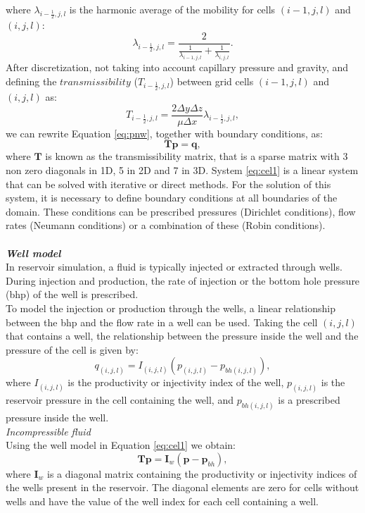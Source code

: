 \documentclass[12pt]{article}
\begin{document}
where $\lambda _{i-\frac{1}{2},j,l}$ is the harmonic average of the mobility for cells 
$(i-1,j,l)$ and $(i,j,l)$:
\begin{equation}\label{eq:ha}
 \lambda _{i-\frac{1}{2},j,l}=\frac{2}{\frac{1}{ \lambda _{i-1,j,l}}+\frac{1}{ \lambda _{i,j,l}}}.
\end{equation}
After discretization, not taking into account capillary pressure and gravity, and defining the $transmissibility$ ($T_{i-\frac{1}{2},j,l}$) between grid cells $(i-1,j,l)$ and $(i,j,l)$ as:
\begin{equation}\label{eq:htrans}
 T_{i-\frac{1}{2},j,l}=\frac{2\Delta y \Delta z}{\mu\Delta x}
 \lambda_{i-\frac{1}{2},j,l},
\end{equation}  
we can rewrite Equation \eqref{eq:pnw}, together with boundary conditions, as:
 \begin{equation}\label{eq:cel1}
\mathbf{T}\mathbf{p} = \mathbf{q},
\end{equation}
where $\mathbf{T}$ is known as the transmissibility matrix, that is a sparse matrix with 3 non zero diagonals in 1D, 5 in 2D and 7 in 3D. 
System \eqref{eq:cel1} is a linear system that can be solved with iterative or direct methods. For the solution of this system, it is necessary to define boundary conditions at all boundaries of the domain. These conditions can be prescribed pressures 
(Dirichlet conditions), flow rates (Neumann conditions) or a combination of these (Robin conditions).  \\\\
\emph{\textbf{Well model}}\\
In reservoir simulation, a fluid is typically injected or extracted through wells. During injection and production, the rate of injection or the bottom hole pressure (bhp) of the well is prescribed.\\
To model the injection or production through the wells, a linear relationship between the bhp and the flow rate in a well can be used. Taking the cell $(i,j,l)$ that contains a well, the relationship between the pressure inside the well and the pressure of the cell is given by:
\begin{equation}\label{eq:wellm}
{q}_{(i,j,l)}={I}_{(i,j,l)}({p}_{(i,j,l)}-{p}_{bh(i,j,l)}),
\end{equation}
where ${I}_{(i,j,l)}$ is the productivity or injectivity index of the well, ${p}_{(i,j,l)}$ is the reservoir pressure in the cell 
containing the well, 
and ${p}_{bh(i,j,l)}$ is a prescribed pressure inside the well. \\
\emph{Incompressible fluid}\\
Using the well model in Equation \eqref{eq:cel1} we obtain:
 \begin{equation}\label{eq:celw1}
\mathbf{T}\mathbf{p} = \mathbf{I}_w(\mathbf{p}-\mathbf{p}_{bh}),
\end{equation}
where $\mathbf{I}_w$ is a diagonal matrix containing the productivity or injectivity indices of the wells present in the reservoir. 
The diagonal elements are zero for cells without wells and have the value of the well index for each cell containing a well.\\
\newpage
\end{document}
